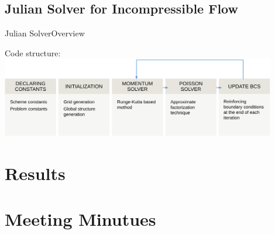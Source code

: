 \documentclass[aspectratio=169, sectionpages, codemintedoverleaf, bibref]{beamer}
\begin{document}
\subsection{Julian Solver for Incompressible Flow}
\begin{frame}{Julian Solver}{Overview}

	\begin{center}
        \large{Code structure:}
        \\
        \vspace{1em}
        \includegraphics[width=0.9\textwidth]{julia}
    \end{center}

\end{frame}







\section{Results}






\section{Meeting Minutues}
\end{document}
